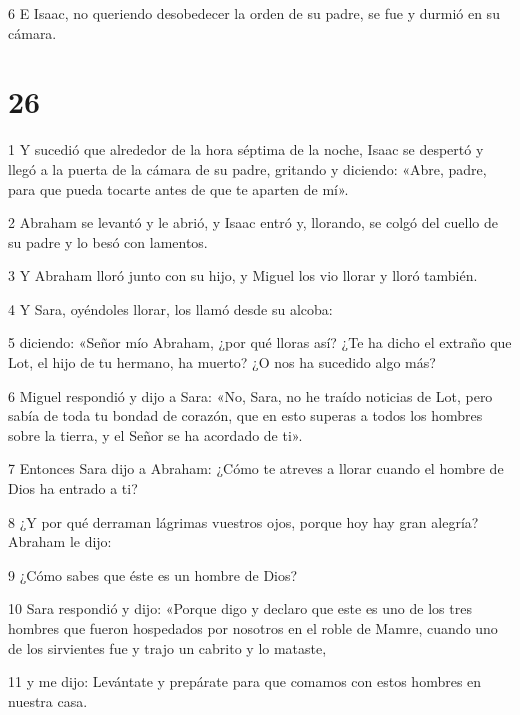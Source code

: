 \par 6 E Isaac, no queriendo desobedecer la orden de su padre, se fue y durmió en su cámara.

\chapter{26}

\par 1 Y sucedió que alrededor de la hora séptima de la noche, Isaac se despertó y llegó a la puerta de la cámara de su padre, gritando y diciendo: «Abre, padre, para que pueda tocarte antes de que te aparten de mí».

\par 2 Abraham se levantó y le abrió, y Isaac entró y, llorando, se colgó del cuello de su padre y lo besó con lamentos.

\par 3 Y Abraham lloró junto con su hijo, y Miguel los vio llorar y lloró también.

\par 4 Y Sara, oyéndoles llorar, los llamó desde su alcoba:

\par 5 diciendo: «Señor mío Abraham, ¿por qué lloras así? ¿Te ha dicho el extraño que Lot, el hijo de tu hermano, ha muerto? ¿O nos ha sucedido algo más?

\par 6 Miguel respondió y dijo a Sara: «No, Sara, no he traído noticias de Lot, pero sabía de toda tu bondad de corazón, que en esto superas a todos los hombres sobre la tierra, y el Señor se ha acordado de ti».

\par 7 Entonces Sara dijo a Abraham: ¿Cómo te atreves a llorar cuando el hombre de Dios ha entrado a ti?

\par 8 ¿Y por qué derraman lágrimas vuestros ojos, porque hoy hay gran alegría? Abraham le dijo:

\par 9 ¿Cómo sabes que éste es un hombre de Dios?

\par 10 Sara respondió y dijo: «Porque digo y declaro que este es uno de los tres hombres que fueron hospedados por nosotros en el roble de Mamre, cuando uno de los sirvientes fue y trajo un cabrito y lo mataste,

\par 11 y me dijo: Levántate y prepárate para que comamos con estos hombres en nuestra casa.

